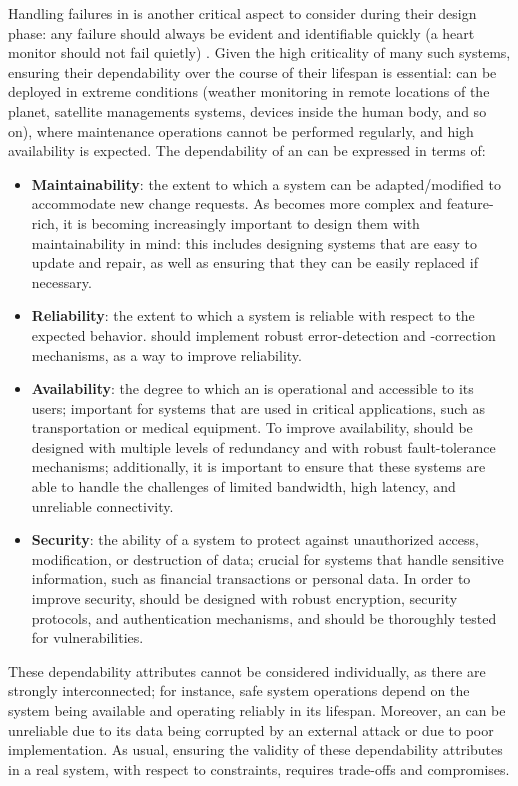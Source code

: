Handling failures in \ess is another critical aspect to consider during their design phase: any failure should always be evident and identifiable quickly (a heart monitor should not fail quietly) \cite{MakingEmbeddedSystems}. Given the high criticality of many such systems, ensuring their dependability over the course of their lifespan is essential: \ess can be deployed in extreme conditions (\eg weather monitoring in remote locations of the planet, satellite managements systems, devices inside the human body, and so on), where maintenance operations cannot be performed regularly, and high availability is expected. 
The dependability of an \es can be expressed in terms of:
\begin{itemize}
    \item \textbf{Maintainability}: the extent to which a system can be adapted/modified to accommodate new change requests. As \ess becomes more complex and feature-rich, it is becoming increasingly important to design them with maintainability in mind: this includes designing systems that are easy to update and repair, as well as ensuring that they can be easily replaced if necessary.
    \item \textbf{Reliability}: the extent to which a system is reliable with respect to the expected behavior. \ess should implement robust error-detection and -correction mechanisms, as a way to improve reliability.
    \item \textbf{Availability}: the degree to which an \es is operational and accessible to its users; important for systems that are used in critical applications, such as transportation or medical equipment. To improve availability, \ess should be designed with multiple levels of redundancy and with robust fault-tolerance mechanisms; additionally, it is important to ensure that these systems are able to handle the challenges of limited bandwidth, high latency, and unreliable connectivity.
    \item \textbf{Security}: the ability of a system to protect against unauthorized access, modification, or destruction of data; crucial for systems that handle sensitive information, such as financial transactions or personal data. In order to improve security, \ess should be designed with robust encryption, security protocols, and authentication mechanisms, and should be thoroughly tested for vulnerabilities.
\end{itemize}

These dependability attributes cannot be considered individually, as there are strongly interconnected; for instance, safe system operations depend on the system being available and operating reliably in its lifespan. Moreover, an \es can be unreliable due to its data being corrupted by an external attack or due to poor implementation. As usual, ensuring the validity of these dependability attributes in a real system, with respect to \es constraints, requires trade-offs and compromises.






